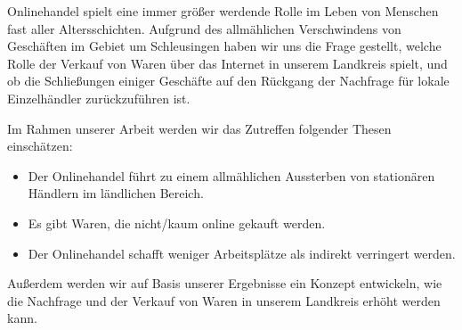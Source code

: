 


Onlinehandel spielt eine immer größer werdende Rolle im Leben von Menschen fast aller Altersschichten. Aufgrund des allmählichen Verschwindens von Geschäften im Gebiet um Schleusingen haben wir uns die Frage gestellt, welche Rolle der Verkauf von Waren über das Internet in unserem Landkreis spielt, und ob die Schließungen einiger Geschäfte auf den Rückgang der Nachfrage für lokale Einzelhändler zurückzuführen ist.

Im Rahmen unserer Arbeit werden wir das Zutreffen folgender Thesen einschätzen:
\begin{itemize}
    \item Der Onlinehandel führt zu einem allmählichen Aussterben von stationären Händlern im ländlichen Bereich.
    
    \item Es gibt Waren, die nicht/kaum online gekauft werden.

    \item Der Onlinehandel schafft weniger Arbeitsplätze als indirekt verringert werden.
\end{itemize}

Außerdem werden wir auf Basis unserer Ergebnisse ein Konzept entwickeln, wie die Nachfrage und der Verkauf von Waren in unserem Landkreis erhöht werden kann.
